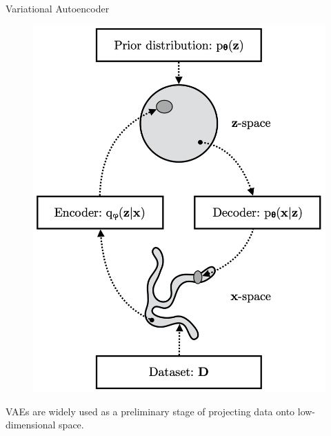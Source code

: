 \documentclass{beamer}
\begin{document}
\begin{frame}{Variational Autoencoder}
\begin{minipage}[t]{0.4\columnwidth}
\begin{figure}[h]
			\includegraphics[width=\linewidth]{figs/vae_scheme}
		\end{figure}
	\end{minipage}
	\eqpause
	VAEs are widely used as a preliminary stage of projecting data onto low-dimensional space.
\end{frame}
\end{document}
